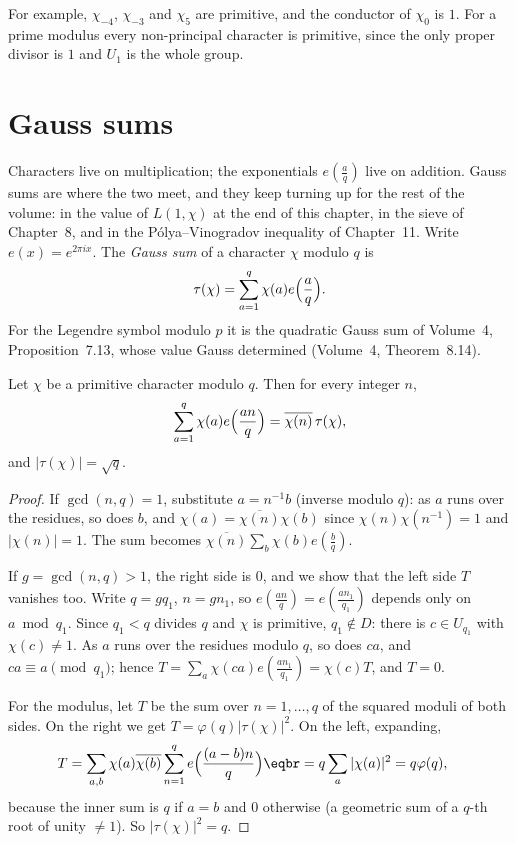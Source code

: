 For example, $\chi_{-4}$, $\chi_{-3}$ and $\chi_5$ are primitive, and the conductor of $\chi_0$ is $1$. For a prime modulus every non-principal
character is primitive, since the only proper divisor is $1$ and $U_1$ is the whole group.

\section{Gauss sums}

Characters live on multiplication; the exponentials $e(\frac aq)$ live on addition. Gauss sums are where the two meet, and they keep turning up
for the rest of the volume: in the value of $L(1,\chi)$ at the end of this chapter, in the sieve of Chapter~8, and in the Pólya--Vinogradov inequality of Chapter~11.
Write $e(x)=e^{2\pi ix}$. The \emph{Gauss sum} of a character $\chi$ modulo $q$ is
\[
\tau(\chi)=\sum_{a=1}^q\chi(a)e\Bigl(\frac aq\Bigr).
\]
For the Legendre symbol modulo $p$ it is the quadratic Gauss sum of Volume~4, Proposition~7.13, whose value Gauss determined
(Volume~4, Theorem~8.14).

\begin{theorem}\label{thm:gauss}
Let $\chi$ be a primitive character modulo $q$. Then for every integer $n$,
\[
\sum_{a=1}^q\chi(a)e\Bigl(\frac{an}q\Bigr)=\overline{\chi(n)}\,\tau(\chi),
\]
and $|\tau(\chi)|=\sqrt q$.
\end{theorem}
\begin{proof}
If $\gcd(n,q)=1$, substitute $a=n^{-1}b$ (inverse modulo $q$): as $a$ runs over the residues, so does $b$, and
$\chi(a)=\overline{\chi(n)}\chi(b)$ since $\chi(n)\chi(n^{-1})=1$ and $|\chi(n)|=1$. The sum becomes $\overline{\chi(n)}\sum_b\chi(b)e(\frac bq)$.

If $g=\gcd(n,q)>1$, the right side is $0$, and we show that the left side $T$ vanishes too. Write $q=gq_1$, $n=gn_1$, so $e(\frac{an}q)=e(\frac{an_1}{q_1})$
depends only on $a\bmod q_1$. Since $q_1<q$ divides $q$ and $\chi$ is primitive, $q_1\notin D$: there is $c\in U_{q_1}$ with $\chi(c)\ne1$. As $a$ runs over the residues
modulo $q$, so does $ca$, and $ca\equiv a\pmod{q_1}$; hence $T=\sum_a\chi(ca)e(\frac{an_1}{q_1})=\chi(c)T$, and $T=0$.

For the modulus, let $T$ be the sum over $n=1,\dots,q$ of the squared moduli of both sides. On the right we get $T=\varphi(q)|\tau(\chi)|^2$. On the left, expanding,
\[
\begin{aligned}T&=\sum_{a,b}\chi(a)\overline{\chi(b)}\sum_{n=1}^qe\Bigl(\frac{(a-b)n}q\Bigr)\eqbr=q\sum_a|\chi(a)|^2=q\varphi(q),\end{aligned}
\]
because the inner sum is $q$ if $a=b$ and $0$ otherwise (a geometric sum of a $q$-th root of unity $\ne1$). So $|\tau(\chi)|^2=q$.
\end{proof}

